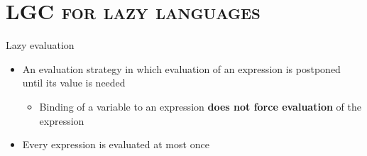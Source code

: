 \documentclass[xcolor=x11names,compress,mathserif]{beamer}
\renewcommand{\(}{\begin{columns}}
\renewcommand{\)}{\end{columns}}
\newcommand{\<}[1]{\begin{column}{#1}}
\renewcommand{\>}{\end{column}}
\begin{document}
\section{\scshape LGC for lazy languages}
\begin{frame} {Lazy evaluation}
\begin{itemize}
\item An evaluation  strategy in which evaluation of  an expression is
  postponed until its value is needed
  \begin{itemize}
  \item Binding  of a  variable to  an expression  {\bf does  not force
    evaluation} of the expression
  \end{itemize}
\item Every expression is evaluated at most once
\end{itemize}
\end{frame}
\end{document}
